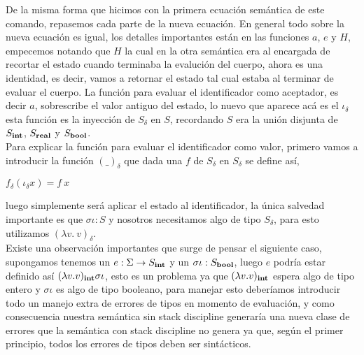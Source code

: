 De la misma forma que hicimos con la primera ecuaci\'on sem\'antica de este
comando, repasemos cada parte de la nueva ecuaci\'on. En general todo sobre 
la nueva ecuaci\'on es igual, los detalles importantes est\'an en las funciones
$a$, $e$ y $H$, empecemos notando que $H$ la cual
en la otra sem\'antica era al encargada de recortar el estado cuando terminaba 
la evaluci\'on del cuerpo, ahora es una identidad, es decir, vamos a retornar el
estado tal cual estaba al terminar de evaluar el cuerpo. La funci\'on para evaluar
el identificador como aceptador, es decir $a$, sobrescribe el valor antiguo del estado,
lo nuevo que aparece ac\'a es el $\iota_\delta$ esta funci\'on es la inyecci\'on
de $S_\delta$ en $S$, recordando $S$ era la uni\'on disjunta de $S_{\textbf{int}}$, 
$S_{\textbf{real}}$ y $S_{\textbf{bool}}$.\\
Para explicar la funci\'on para evaluar el identificador
como valor, primero vamos a introducir la funci\'on $(\_)_{\delta}$ que dada una $f$
de $S_\delta$ en $S_\delta$ se define as\'i,
\begin{center}
$f_{\delta}(\iota_{\delta}x) = f \ x$
\end{center}
luego simplemente ser\'a aplicar el estado al identificador, la \'unica 
salvedad importante es que $\sigma \iota : S$ y nosotros necesitamos algo de tipo
$S_\delta$, para esto utilizamos $(\lambda v. \ v)_\delta$.\\

Existe una observaci\'on importantes que surge de pensar el siguiente caso,
supongamos tenemos un $e : \Sigma \rightarrow S_{\textbf{int}}$ y un $\sigma \iota : S_{\textbf{bool}}$,
luego $e$ podr\'ia estar definido as\'i $(\lambda v . v)_{\textbf{int}}\sigma \iota$, esto es
un problema ya que $(\lambda v . v)_{\textbf{int}}$ espera algo de tipo entero y 
$\sigma \iota$ es algo de tipo booleano, para manejar esto deber\'iamos 
introducir todo un manejo extra de errores de tipos en momento de evaluaci\'on, 
y como consecuencia nuestra sem\'antica sin stack discipline generar\'ia una
nueva clase de errores que la sem\'antica con stack discipline no genera ya que,
seg\'un el primer principio, todos los errores de tipos deben ser sint\'acticos. \\

